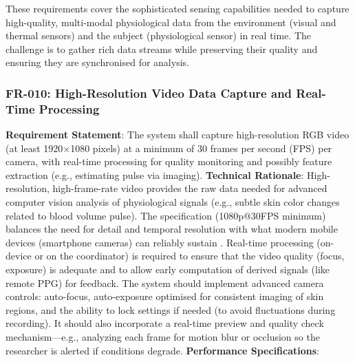 \documentclass[11pt,a4paper]{report}
\begin{document}
These requirements cover the sophisticated sensing capabilities needed to capture high-quality, multi-modal physiological data from the environment (visual and thermal sensors) and the subject (physiological sensor) in real time. The challenge is to gather rich data streams while preserving their quality and ensuring they are synchronised for analysis. \subsubsection*{FR-010: High-Resolution Video Data Capture and Real-Time Processing}
\textbf{Requirement Statement}: The system shall capture high-resolution RGB video (at least 1920$\times$1080 pixels) at a minimum of 30 frames per second (FPS) per camera, with real-time processing for quality monitoring and possibly feature extraction (e.g., estimating pulse via imaging). \textbf{Technical Rationale}: High-resolution, high-frame-rate video provides the raw data needed for advanced computer vision analysis of physiological signals (e.g., subtle skin color changes related to blood volume pulse). The specification (1080p@30FPS minimum) balances the need for detail and temporal resolution with what modern mobile devices (smartphone cameras) can reliably sustain \cite{Szeliski2010CVbook}. Real-time processing (on-device or on the coordinator) is required to ensure that the video quality (focus, exposure) is adequate and to allow early computation of derived signals (like remote PPG) for feedback. The system should implement advanced camera controls: auto-focus, auto-exposure optimised for consistent imaging of skin regions, and the ability to lock settings if needed (to avoid fluctuations during recording). It should also incorporate a real-time preview and quality check mechanism—e.g., analyzing each frame for motion blur or occlusion so the researcher is alerted if conditions degrade. \textbf{Performance Specifications}:
\end{document}
